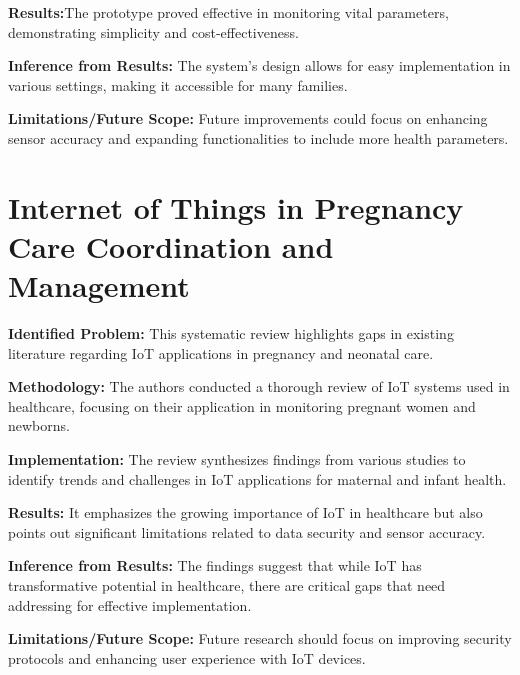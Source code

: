 \documentclass[12pt,a4paper]{report}
\begin{document}
\noindent\textbf{Results:}The prototype proved effective in monitoring vital parameters, demonstrating simplicity and cost-effectiveness.

\setlength{\parskip}{1em}  %

\noindent\textbf{Inference from Results:} The system's design allows for easy implementation in various settings, making it accessible for many families.
\setlength{\parskip}{1em}  %

\noindent\textbf{Limitations/Future Scope:} Future improvements could focus on enhancing sensor accuracy and expanding functionalities to include more health parameters.
\setlength{\parskip}{1em}  %

\section{Internet of Things in Pregnancy Care Coordination and Management}

\textbf{Identified Problem: }This systematic review highlights gaps in existing literature regarding IoT applications in pregnancy and neonatal care\cite{Hossain2023}.
\setlength{\parskip}{1em}  %


\noindent\textbf{Methodology:} The authors conducted a thorough review of IoT systems used in healthcare, focusing on their application in monitoring pregnant women and newborns.
\setlength{\parskip}{1em}  %


\noindent\textbf{Implementation:} The review synthesizes findings from various studies to identify trends and challenges in IoT applications for maternal and infant health.
\setlength{\parskip}{1em}  %

\noindent\textbf{Results:}  It emphasizes the growing importance of IoT in healthcare but also points out significant limitations related to data security and sensor accuracy.
\setlength{\parskip}{1em}  %


\noindent\textbf{Inference from Results:}  The findings suggest that while IoT has transformative potential in healthcare, there are critical gaps that need addressing for effective implementation.

\setlength{\parskip}{1em}  %

\noindent\textbf{Limitations/Future Scope:} Future research should focus on improving security protocols and enhancing user experience with IoT devices.
\end{document}
